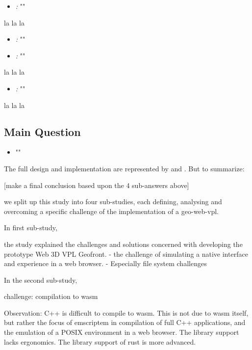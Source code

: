 \begin{itemize}[ ]
  \item \emph{\mySubRQOneTitle:} "\mySubRQOne"
\end{itemize}

la la la

\begin{itemize}[ ]
  \item \emph{\mySubRQTwoTitle:} "\mySubRQTwo"
\end{itemize}


\begin{itemize}[ ]
  \item \emph{\mySubRQThreeTitle:}  "\mySubRQThree"
\end{itemize}

la la la

\begin{itemize}[ ]
  \item \emph{\mySubRQFourTitle:} "\mySubRQFour"
\end{itemize}

la la la



\subsection*{Main Question}

\begin{itemize}[ ]
    \item "\myMainRQ"
\end{itemize}

The full design and implementation are represented by  and . 
But to summarize:

[make a final conclusion based upon the 4 sub-answers above]

we split up this study into four sub-studies, each defining, analysing and overcoming a specific challenge of the implementation of a \ac{geo-web-vpl}.

In first sub-study, 

the study explained the challenges and solutions concerned with developing the prototype Web 3D VPL Geofront.
- the challenge of simulating a native interface and experience in a web browser. 
- Especially file system challenges 

In the second sub-study,

challenge: 
compilation to wasm

Observation: 
C++ is difficult to compile to wasm.
This is not due to wasm itself, but rather the focus of emscriptem in compilation of full C++ applications, and the emulation of a POSIX environment in a web browser. 
The library support lacks ergonomics.
The library support of rust is more advanced.

